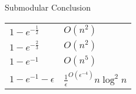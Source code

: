 \begin{frame}{Submodular Conclusion}
    \begin{center}
        \Large
        \begin{tabular}{l l}
            \hline
            $1 - e^{-\frac{1}{2}}$ & $O(n^2)$
            \\
            \color{orange}$1 - e^{-\frac{2}{3}}$ & \color{orange}$O(n^2)$
            \\
            $1 - e^{-1}$ & $O(n^5)$
            \\
            $1 - e^{-1} - \epsilon$ & $\frac{1}{\epsilon}^{O(\epsilon^{-4})}n \log^2 n$
            \\
            \hline
        \end{tabular}
    \end{center}
\end{frame}